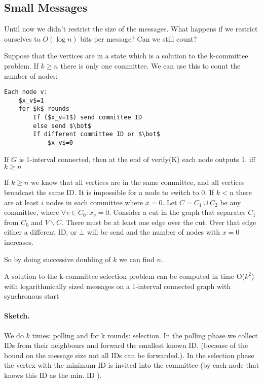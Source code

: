 \subsection{Small Messages}

Until now we didn't restrict the size of the messages. What happens if we restrict ourselves to $O(\log n)$ bits per message? Can we still count?

Suppose that the vertices are in a state which is a solution to the k-committee problem. If $k\geq n$ there is only one committee. We can use this to count the number of nodes:

\begin{lstlisting}
Each node v:
	$x_v$=1
	for $k$ rounds
		If ($x_v=1$) send committee ID
		else send $\bot$
		If different committee ID or $\bot$
			$x_v$=0
\end{lstlisting}

\begin{lem} If $G$ is 1-interval connected, then at the end of verify(K) each node outputs 1, iff $k\geq n$\end{lem}
\begin{pr} If $k\geq n$ we know that all vertices are in the same committee, and all vertices broadcast the same ID. It is impossible for a node to switch to $0$. If $k<n$ there are at least $i$ nodes in each committee where $x=0$. Let $C = C_1 \dot \cup C_2$ be any committee, where $\forall v\in C_0: x_v=0$. Consider a cut in the graph that separates $C_1$ from $C_0$ and $V\backslash C$. There must be at least one edge over the cut. Over that edge either a different ID, or $\bot$ will be send and the number of nodes with $x=0$ increases.
\end{pr}

So by doing successive doubling of $k$ we can find $n$.

\begin{thm} A solution to the k-committee selection problem can be computed in time O($k^2$) with logarithmically sized messages on a 1-interval connected graph with synchronous start\end{thm}

\paragraph{Sketch.} We do $k$ times: polling and for k rounds: selection. In the polling phase we collect IDs from their neighbours and forward the smallest known ID. (because of the bound on the message size not all IDs can be forwarded.). In the selection phase the vertex with the minimum ID is invited into the committee (by each node that knows this ID as the min. ID	).
